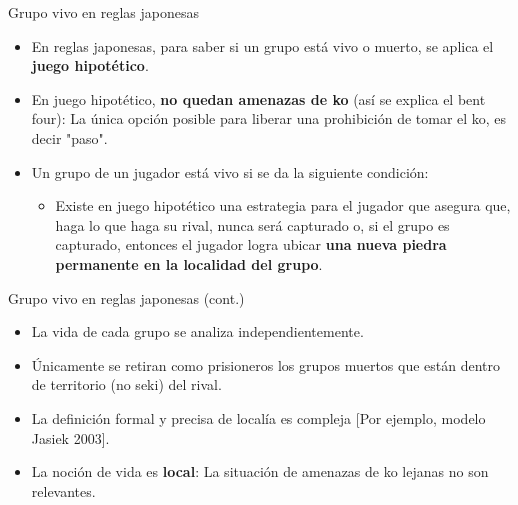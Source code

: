 \documentclass{beamer}
\begin{document}
\begin{frame}{Grupo vivo en reglas japonesas}
    \begin{itemize}
        \item En reglas japonesas, para saber si un grupo está vivo o muerto, se aplica el \textbf{juego hipotético}.
        \item En juego hipotético, \textbf{no quedan amenazas de ko} (así se explica el bent four): La única opción posible para liberar una prohibición de tomar el ko, es decir "paso".
        \item Un grupo de un jugador está vivo si se da la siguiente condición:
            \begin{itemize}
                \item Existe en juego hipotético una estrategia para el jugador que asegura que, haga lo que haga su rival, nunca será capturado o, si el grupo es capturado, entonces
                 el jugador logra ubicar \textbf{una nueva piedra permanente en la localidad del grupo}. 
            \end{itemize}
    \end{itemize}
    
\end{frame}

\begin{frame}{Grupo vivo en reglas japonesas (cont.)}
    \begin{itemize}
        \item La vida de cada grupo se analiza independientemente.
        \item Únicamente se retiran como prisioneros los grupos muertos que están dentro de territorio (no seki) del rival.
        \item La definición formal y precisa de localía es compleja [Por ejemplo, modelo Jasiek 2003].
        \item La noción de vida es \textbf{local}: La situación de amenazas de ko lejanas no son relevantes.
    \end{itemize}
    
\end{frame}
\end{document}
